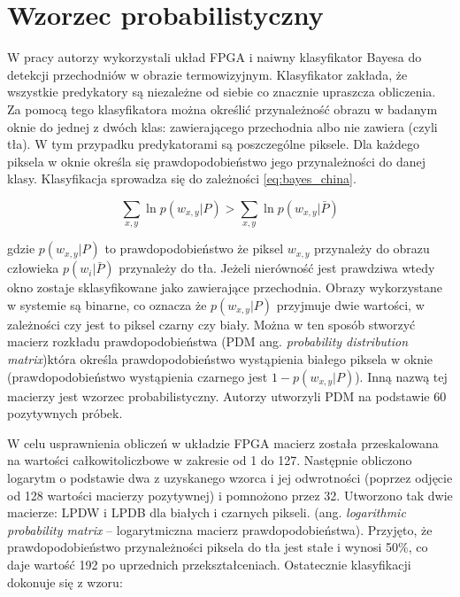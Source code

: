 \section{Wzorzec probabilistyczny}
\label{sec:xiao_2015}
W pracy \cite{xiao_2015} autorzy wykorzystali układ FPGA i naiwny klasyfikator Bayesa do detekcji przechodniów w obrazie termowizyjnym. Klasyfikator zakłada, że wszystkie predykatory są niezależne od siebie co znacznie upraszcza obliczenia. Za pomocą tego klasyfikatora można określić przynależność obrazu w badanym oknie do jednej z dwóch klas: zawierającego przechodnia albo nie zawiera (czyli tła). W tym przypadku predykatorami są poszczególne piksele. Dla każdego piksela w oknie określa się prawdopodobieństwo jego przynależności do danej klasy. Klasyfikacja sprowadza się do zależności \eqref{eq:bayes_china}.

\begin{equation} \label{eq:bayes_china}
\sum_{x,y} \ln p(w_{x,y}|P) > \sum_{x,y} \ln p(w_{x,y}|\bar{P})
\end{equation}

\noindent gdzie \( p(w_{x,y}|P) \) to prawdopodobieństwo że piksel $w_{x,y}$ przynależy do obrazu człowieka
\( p(w_i|\bar{P}) \) przynależy do tła.
Jeżeli nierówność jest prawdziwa wtedy okno zostaje sklasyfikowane jako zawierające przechodnia.
Obrazy wykorzystane w systemie są binarne, co oznacza że \( p(w_{x,y}|P) \) przyjmuje dwie wartości, w zależności czy jest to piksel czarny czy biały. Można w ten sposób stworzyć macierz rozkładu prawdopodobieństwa (PDM ang. \textit{probability distribution matrix})która określa prawdopodobieństwo wystąpienia białego piksela w oknie (prawdopodobieństwo wystąpienia czarnego jest \(1-  p(w_{x,y}|P) \)). Inną nazwą tej macierzy jest wzorzec probabilistyczny.
Autorzy utworzyli PDM na podstawie 60 pozytywnych próbek. 

W celu usprawnienia obliczeń w układzie FPGA macierz została przeskalowana na wartości całkowitoliczbowe w zakresie od 1 do 127. 
Następnie obliczono logarytm o podstawie dwa z uzyskanego wzorca i jej odwrotności (poprzez odjęcie od 128 wartości macierzy pozytywnej) i pomnożono przez 32. %
Utworzono tak dwie macierze: LPDW i LPDB dla białych i czarnych pikseli. (ang. \textit{logarithmic probability matrix} – logarytmiczna macierz prawdopodobieństwa). 
Przyjęto, że prawdopodobieństwo przynależności piksela do tła jest stałe i wynosi 50\%, co daje wartość 192 po uprzednich przekształceniach. 
Ostatecznie klasyfikacji dokonuje się z wzoru: 

